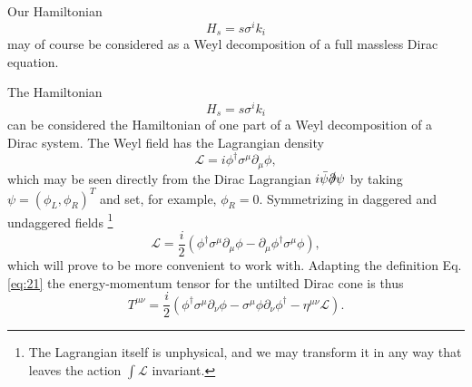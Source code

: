 Our Hamiltonian
\[
H_s = s \sigma^i k_i
\]
may of course be considered as a Weyl decomposition of a full massless Dirac equation.


The Hamiltonian
\[
H_s = s \sigma^i k_i
\]
can be considered the Hamiltonian of one part of a Weyl decomposition of a Dirac system.
The Weyl field has the Lagrangian density \cite{kachelriessQuantumFieldsHubble2018}
\begin{equation}
  \label{eq:18}
  \mathcal{L} = i \phi^{\dagger} \sigma^{\mu} \partial_{\mu} \phi,
\end{equation}
which may be seen directly from the Dirac Lagrangian \( i \bar{\psi} \slashed{\partial } \psi  \) by taking \( \psi = (\phi_L, \phi_R)^T \) and set, for example, \( \phi _R = 0 \).
Symmetrizing in daggered and undaggered fields
\footnote{The Lagrangian itself is unphysical, and we may transform it in any way that leaves the action \( \int \mathcal{L} \) invariant.}
\[
  \mathcal{L} = \frac{i}{2} \left(\phi^{\dagger} \sigma^{\mu} \partial_{\mu} \phi - \partial_{\mu} \phi^{\dagger} \sigma^{\mu} \phi \right),
\]
which will prove to be more convenient to work with.
Adapting the definition Eq. \eqref{eq:21} the energy-momentum tensor for the untilted Dirac cone is thus
\begin{equation}
  \label{eq:20}
  T^{\mu \nu} =
  \frac{i}{2} (
  \phi^{\dagger} \sigma^{\mu} \partial_{\nu} \phi
  - \sigma^{\mu} \phi \partial_{\nu} \phi^{\dagger}
  - \eta^{\mu \nu} \mathcal{L}
  ).
\end{equation}

